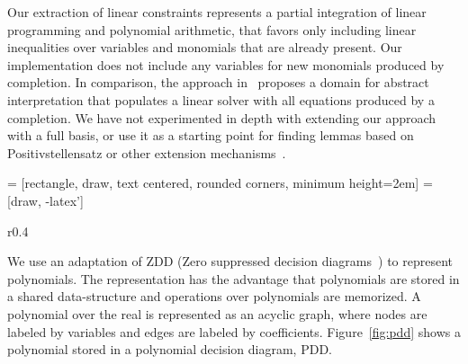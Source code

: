 Our extraction of linear constraints represents a partial integration of linear programming and polynomial arithmetic,
that favors only including linear inequalities over variables and monomials that are already present. Our implementation
does not include any variables for new monomials produced by completion.
In comparison, the approach in~\cite{DBLP:journals/pacmpl/KincaidKZ23} proposes a domain for abstract interpretation that populates a linear
solver with all equations produced by a completion. We have not experimented in depth with extending our approach with a full basis,
or use it as a starting point for finding lemmas based on Positivstellensatz or other extension mechanisms~\cite{DBLP:conf/csl/Tiwari05}.





\usetikzlibrary{shapes,arrows}
\usetikzlibrary{positioning}

 = [rectangle, draw, text centered, rounded corners, minimum height=2em]
 = [draw, -latex']

\begin{wrapfigure}{r}{0.4\textwidth} 
  \begin{center}

  \end{center}
  \vspace{1pt}
  \caption{PDD representation of $5x^2y + xy + y + x + 1$\label{fig:pdd}}
\end{wrapfigure}
We use an adaptation of ZDD (Zero suppressed decision diagrams~\cite{Minato93,NishinoYMN16}) to represent polynomials.
The representation has the advantage that polynomials are stored in a shared data-structure and operations
over polynomials are memorized. A polynomial over the real is represented as an acyclic graph, where 
nodes are labeled by variables and edges are labeled by coefficients. Figure~\ref{fig:pdd} shows a polynomial stored
in a polynomial decision diagram, PDD.


